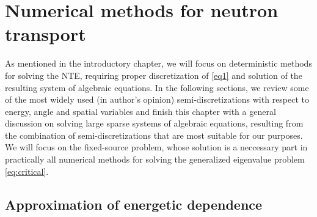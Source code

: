 \ifpdf
	\graphicspath{{3/pic/PNG/}{3/pic/PDF/}{3/pic/}}
\else
	\graphicspath{{3/pic/EPS/}{3/pic/}}
\fi

\chapter{Numerical methods for neutron transport}\label{chap:nte-methods}

As mentioned in the introductory chapter, we will focus on deterministic methods for solving the NTE, requiring proper
discretization of \eqref{eq1} and solution of the resulting system of algebraic equations. 
In the following sections, we review some of the most widely used (in author's opinion) semi-discretizations with respect to
energy, angle and spatial variables and finish this chapter with a general discussion on solving large sparse systems of
algebraic equations, resulting from the combination of semi-discretizations that are most suitable for our purposes. We
will focus on the fixed-source problem, whose solution is a neccessary part in practically all numerical methods for
solving the generalized eigenvalue problem \eqref{eq:critical}.

\section{Approximation of energetic dependence}\label{sec:MG}

